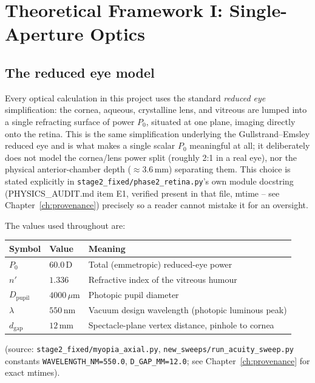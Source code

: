 \chapter{Theoretical Framework I: Single-Aperture Optics}
\label{ch:single}

\section{The reduced eye model}
\label{sec:reduced-eye}
Every optical calculation in this project uses the standard \emph{reduced eye}
simplification: the cornea, aqueous, crystalline lens, and vitreous are lumped into a
single refracting surface of power $P_0$, situated at one plane, imaging directly onto
the retina. This is the same simplification underlying the Gullstrand--Emsley reduced
eye and is what makes a single scalar $P_0$ meaningful at all; it deliberately does not
model the cornea/lens power split (roughly 2:1 in a real eye), nor the physical
anterior-chamber depth ($\approx 3.6$\,mm) separating them. This choice is stated
explicitly in \texttt{stage2\_fixed/phase2\_retina.py}'s own module docstring
(PHYSICS\_AUDIT.md item E1, verified present in that file, mtime -- see
Chapter~\ref{ch:provenance}) precisely so a reader cannot mistake it for an oversight.

The values used throughout are:
\begin{center}
\begin{tabular}{lll}
\toprule
Symbol & Value & Meaning \\
\midrule
$P_0$ & $60.0$\,D & Total (emmetropic) reduced-eye power \\
$n'$ & $1.336$ & Refractive index of the vitreous humour \\
$D_{\mathrm{pupil}}$ & $4000\,\mu$m & Photopic pupil diameter \\
$\lambda$ & $550$\,nm & Vacuum design wavelength (photopic luminous peak) \\
$d_{\mathrm{gap}}$ & $12$\,mm & Spectacle-plane vertex distance, pinhole to cornea \\
\bottomrule
\end{tabular}
\end{center}
(source: \texttt{stage2\_fixed/myopia\_axial.py}, \texttt{new\_sweeps/run\_acuity\_sweep.py}
constants \texttt{WAVELENGTH\_NM=550.0}, \texttt{D\_GAP\_MM=12.0}; see
Chapter~\ref{ch:provenance} for exact mtimes).

